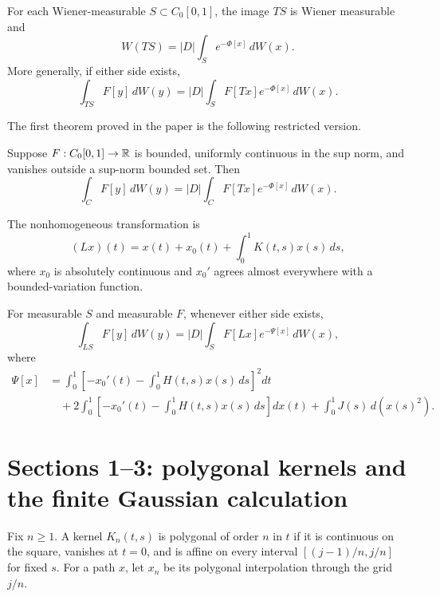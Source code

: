 \begin{theorem}
For each Wiener-measurable \(S\subset C_0[0,1]\), the image \(TS\) is Wiener measurable and
\[
 W(TS)=|D|\int_S e^{-\Phi[x]}\,dW(x).
\]
More generally, if either side exists,
\[
 \int_{TS}F[y]\,dW(y)
 =|D|\int_SF[Tx]e^{-\Phi[x]}\,dW(x).
\]
\end{theorem}

The first theorem proved in the paper is the following restricted version.

\begin{theorem}
Suppose \(F:C_0[0,1]\to\mathbb{R}\) is bounded, uniformly continuous in the sup norm, and vanishes outside a sup-norm bounded set.  Then
\[
 \int_CF[y]\,dW(y)
 =|D|\int_CF[Tx]e^{-\Phi[x]}\,dW(x).
\]
\end{theorem}

The nonhomogeneous transformation is
\begin{equation}
 (Lx)(t)=x(t)+x_0(t)+\int_0^1K(t,s)x(s)\,ds,
 \tag{0.11}\label{eq:CM-L}
\end{equation}
where \(x_0\) is absolutely continuous and \(x_0'\) agrees almost everywhere with a bounded-variation function.

\begin{theorem}
For measurable \(S\) and measurable \(F\), whenever either side exists,
\[
 \int_{LS}F[y]\,dW(y)
 =|D|\int_SF[Lx]e^{-\Psi[x]}\,dW(x),
\]
where
\begin{align*}
 \Psi[x]
 &=\int_0^1\left[-x_0'(t)-\int_0^1H(t,s)x(s)\,ds\right]^2dt\\
 &\quad+2\int_0^1\left[-x_0'(t)-\int_0^1H(t,s)x(s)\,ds\right]dx(t)
 +\int_0^1J(s)\,d(x(s)^2).
\end{align*}
\end{theorem}

\section{Sections 1--3: polygonal kernels and the finite Gaussian calculation}

Fix \(n\ge1\).  A kernel \(K_n(t,s)\) is polygonal of order \(n\) in \(t\) if it is continuous on the square, vanishes at \(t=0\), and is affine on every interval \([(j-1)/n,j/n]\) for fixed \(s\).  For a path \(x\), let \(x_n\) be its polygonal interpolation through the grid \(j/n\).

